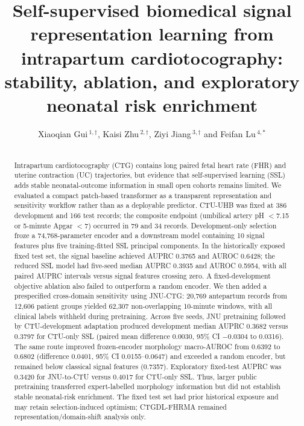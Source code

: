 \documentclass[utf8]{FrontiersinHarvard}
\def\firstAuthorLast{Gui {et~al.}}
\def\Authors{Xiaoqian Gui\,$^{1,\dagger}$, Kaisi Zhu\,$^{2,\dagger}$, Ziyi Jiang\,$^{3,\dagger}$ and Feifan Lu\,$^{4,*}$}
\begin{document}
\onecolumn
{}

\title[Self-supervised CTG representations]{Self-supervised biomedical signal representation learning from intrapartum cardiotocography: stability, ablation, and exploratory neonatal risk enrichment}

\author[\firstAuthorLast ]{\Authors}
\address{}
\correspondance{}
\maketitle

\begin{abstract}
\section{}
Intrapartum cardiotocography (CTG) contains long paired fetal heart rate (FHR) and uterine contraction (UC) trajectories, but evidence that self-supervised learning (SSL) adds stable neonatal-outcome information in small open cohorts remains limited. We evaluated a compact patch-based transformer as a transparent representation and sensitivity workflow rather than as a deployable predictor. CTU-UHB was fixed at 386 development and 166 test records; the composite endpoint (umbilical artery pH $<$7.15 or 5-minute Apgar $<$7) occurred in 79 and 34 records. Development-only selection froze a 74,768-parameter encoder and a downstream model containing 10 signal features plus five training-fitted SSL principal components. In the historically exposed fixed test set, the signal baseline achieved AUPRC 0.3765 and AUROC 0.6428; the reduced SSL model had five-seed median AUPRC 0.3935 and AUROC 0.5954, with all paired AUPRC intervals versus signal features crossing zero. A fixed-development objective ablation also failed to outperform a random encoder. We then added a prespecified cross-domain sensitivity using JNU-CTG: 20,769 antepartum records from 12,606 patient groups yielded 62,307 non-overlapping 10-minute windows, with all clinical labels withheld during pretraining. Across five seeds, JNU pretraining followed by CTU-development adaptation produced development median AUPRC 0.3682 versus 0.3797 for CTU-only SSL (paired mean difference 0.0030, 95\% CI $-0.0304$ to 0.0316). The same route improved frozen-encoder morphology macro-AUROC from 0.6392 to 0.6802 (difference 0.0401, 95\% CI 0.0155--0.0647) and exceeded a random encoder, but remained below classical signal features (0.7357). Exploratory fixed-test AUPRC was 0.3420 for JNU-to-CTU versus 0.4017 for CTU-only SSL. Thus, larger public pretraining transferred expert-labelled morphology information but did not establish stable neonatal-risk enrichment. The fixed test set had prior historical exposure and may retain selection-induced optimism; CTGDL-FHRMA remained representation/domain-shift analysis only.


\end{abstract}
\end{document}
